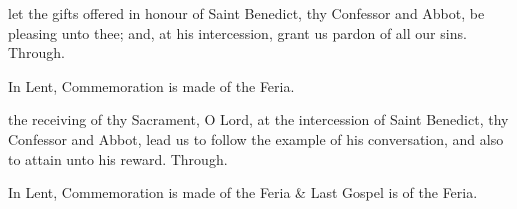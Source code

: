 \secret
{} let the gifts offered in honour of Saint Benedict, thy Confessor and Abbot, be pleasing unto thee; and, at his intercession, grant us pardon of all our sins. Through.
\begin{rubric}
    In Lent, Commemoration is made of the Feria.
\end{rubric}
\postcommunion
{} the receiving of thy Sacrament, O Lord, at the intercession of Saint Benedict, thy Confessor and Abbot, lead us to follow the example of his conversation, and also to attain unto his reward. Through.
\begin{rubric}
    In Lent, Commemoration is made of the Feria \& Last Gospel is of the Feria.
\end{rubric}






